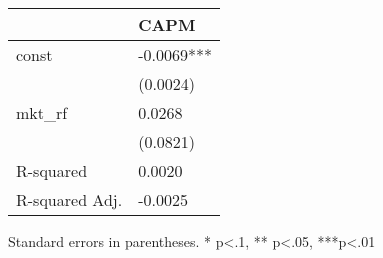 \begin{table}
\caption{}
\label{}
\begin{center}
\begin{tabular}{ll}
\hline
               & CAPM        \\
\hline
const          & -0.0069***  \\
               & (0.0024)    \\
mkt\_rf        & 0.0268      \\
               & (0.0821)    \\
R-squared      & 0.0020      \\
R-squared Adj. & -0.0025     \\
\hline
\end{tabular}
\end{center}
\end{table}
\bigskip
Standard errors in parentheses. \newline 
* p<.1, ** p<.05, ***p<.01